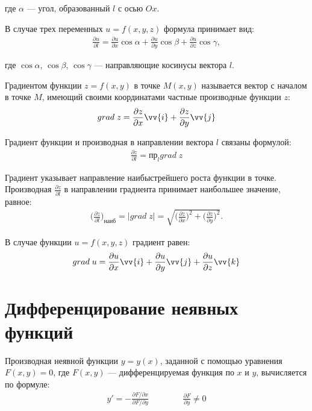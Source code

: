 \documentclass[a4paper,12pt,oneside]{extbook}
\theoremstyle{numbered}
\theoremstyle{unnumbered}
\theoremstyle{named}
\theoremstyle{unnumbered}
\theoremstyle{named}
\theoremstyle{named}
\theoremstyle{named}
\begin{document}
где \(\alpha\) — угол, образованный \(l\) с осью \(Ox\).

В случае трех переменных \(u = f(x, y, z)\) формула принимает вид:
\begin{gather*}
    \frac{\partial u}{\partial l} = \frac{\partial u}{\partial x} \cos{\alpha} + \frac{\partial u}{\partial y} \cos{\beta} + \frac{\partial u}{\partial z} \cos{\gamma},
\end{gather*}

где \(\cos{\alpha}\), \(\cos{\beta}\), \(\cos{\gamma}\) — направляющие косинусы вектора \(l\).

Градиентом функции \(z = f(x, y)\) в точке \(M(x, y)\) называется вектор с началом в точке \(M\), имеющий своими координатами частные производные функции \(z\):
\begin{gather*}
    grad \; z = \frac{\partial z}{\partial x} \vv{i} + \frac{\partial z}{\partial y} \vv{j}
\end{gather*}

Градиент функции и производная в направлении вектора \(l\) связаны формулой:
\begin{gather*}
    \frac{\partial z}{\partial l} = \text{пр}_l grad \; z
\end{gather*}

Градиент указывает направление наибыстрейшего роста функции в точке. Производная \(\frac{\partial z}{\partial l}\) в направлении градиента принимает наибольшее значение, равное:
\begin{gather*}
    \Big(\frac{\partial z}{\partial l}\Big)_\text{наиб} = |grad \; z| = \sqrt{\Big(\frac{\partial z}{\partial x}\Big)^2 + \Big(\frac{\partial z}{\partial y}\Big)^2}.
\end{gather*}

В случае функции \(u = f(x, y, z)\) градиент равен:
\begin{gather*}
    grad \; u = \frac{\partial u}{\partial x}\vv{i} + \frac{\partial u}{\partial y}\vv{j} + \frac{\partial u}{\partial z}\vv{k}
\end{gather*}

\section{Дифференцирование неявных функций}%
\label{sec:Дифференцирование неявных функций}

Производная неявной функции \(y = y(x)\), заданной с помощью уравнения \(F(x, y) = 0\), где \(F(x, y)\) — дифференцируемая функция по \(x\) и \(y\), вычисляется по формуле:
\begin{gather*}
    y' = -\frac{\partial F / \partial x}{\partial F / \partial y} \qquad \qquad \frac{\partial F}{\partial y} \neq 0
\end{gather*}
\end{document}
